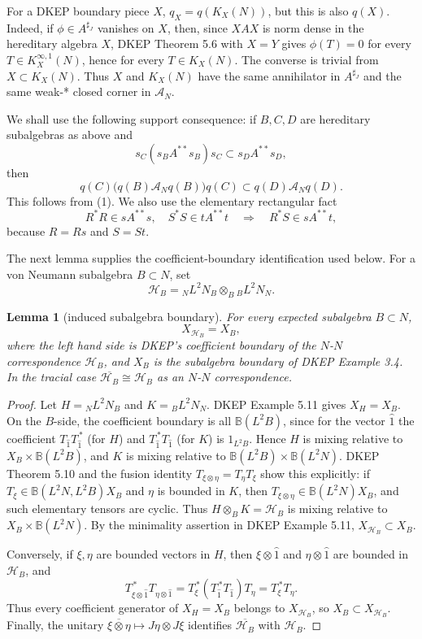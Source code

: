 \documentclass[12pt]{article}
\newtheorem{lemma}{Lemma}
\newcommand{\cA}{\mathcal A}
\newcommand{\cH}{\mathcal H}
\begin{document}
For a DKEP boundary piece \(X\), \(q_X=q(K_X(N))\), but this is also \(q(X)\).
Indeed, if \(\phi\in A^{\sharp_J}\) vanishes on \(X\), then, since \(XAX\) is
norm dense in the hereditary algebra \(X\), DKEP Theorem 5.6 with \(X=Y\) gives
\(\phi(T)=0\) for every \(T\in K_X^{\infty,1}(N)\), hence for every
\(T\in K_X(N)\).  The converse is trivial from \(X\subset K_X(N)\).  Thus \(X\)
and \(K_X(N)\) have the same annihilator in \(A^{\sharp_J}\) and the same
weak-* closed corner in \(\cA_N\).

We shall use the following support consequence: if \(B,C,D\) are hereditary
subalgebras as above and
\[
        s_C(s_BA^{**}s_B)s_C\subset s_DA^{**}s_D,                \tag{2}
\]
then
\[
        q(C)\bigl(q(B)\cA_Nq(B)\bigr)q(C)\subset q(D)\cA_Nq(D).   \tag{3}
\]
This follows from (1).  We also use the elementary rectangular fact
\[
R^*R\in sA^{**}s,\quad S^*S\in tA^{**}t
       \quad\Longrightarrow\quad R^*S\in sA^{**}t,               \tag{4}
\]
because \(R=Rs\) and \(S=St\).

The next lemma supplies the coefficient-boundary identification used below.
For a von Neumann subalgebra \(B\subset N\), set
\[
        \cH_B={}_NL^2N_B\otimes_B{}_BL^2N_N .
\]

\begin{lemma}[induced subalgebra boundary]\label{lem:coeff}
For every expected subalgebra \(B\subset N\),
\[
        X_{\cH_B}=X_B ,
\]
where the left hand side is DKEP's coefficient boundary of the \(N\)-\(N\)
correspondence \(\cH_B\), and \(X_B\) is the subalgebra boundary of DKEP
Example 3.4.  In the tracial case \(\overline{\cH_B}\cong\cH_B\) as an
\(N\)-\(N\) correspondence.
\end{lemma}

\begin{proof}
Let \(H={}_NL^2N_B\) and \(K={}_BL^2N_N\).  DKEP Example 5.11 gives
\(X_H=X_B\).  On the \(B\)-side, the coefficient boundary is all
\(\mathbb B(L^2B)\), since for the vector \(\widehat 1\) the coefficient
\(T_{\widehat1}T_{\widehat1}^{\,*}\) (for \(H\)) and
\(T_{\widehat1}^{\,*}T_{\widehat1}\) (for \(K\)) is \(1_{L^2B}\).  Hence
\(H\) is mixing relative to \(X_B\times\mathbb B(L^2B)\), and \(K\) is mixing
relative to \(\mathbb B(L^2B)\times\mathbb B(L^2N)\).  DKEP Theorem 5.10 and
the fusion identity \(T_{\xi\otimes\eta}=T_\eta T_\xi\) show this explicitly:
if \(T_\xi\in\mathbb B(L^2N,L^2B)X_B\) and \(\eta\) is bounded in \(K\), then
\(T_{\xi\otimes\eta}\in\mathbb B(L^2N)X_B\), and such elementary tensors are
cyclic.  Thus \(H\otimes_BK=\cH_B\) is mixing relative to
\(X_B\times\mathbb B(L^2N)\).  By the minimality assertion in DKEP Example 5.11,
\(X_{\cH_B}\subset X_B\).

Conversely, if \(\xi,\eta\) are bounded vectors in \(H\), then
\(\xi\otimes\widehat1\) and \(\eta\otimes\widehat1\) are bounded in
\(\cH_B\), and
\[
 T_{\xi\otimes\widehat1}^{\,*}T_{\eta\otimes\widehat1}
 =T_\xi^{\,*}(T_{\widehat1}^{\,*}T_{\widehat1})T_\eta
 =T_\xi^{\,*}T_\eta .
\]
Thus every coefficient generator of \(X_H=X_B\) belongs to \(X_{\cH_B}\), so
\(X_B\subset X_{\cH_B}\).  Finally, the unitary
\(\overline{\xi\otimes\eta}\mapsto J\eta\otimes J\xi\) identifies
\(\overline{\cH_B}\) with \(\cH_B\).
\end{proof}
\end{document}
